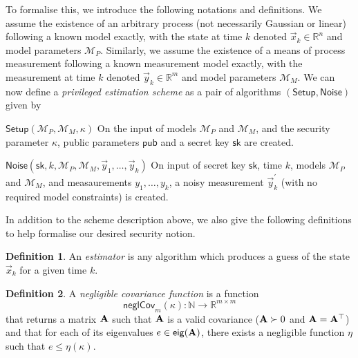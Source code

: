 \documentclass[letterpaper, 10 pt, conference]{IEEEtran}
\theoremstyle{definition}
\newtheorem{definition}{Definition}[section]
\theoremstyle{definition}
\theoremstyle{remark}
\begin{document}
To formalise this, we introduce the following notations and definitions. We assume the existence of an arbitrary process (not necessarily Gaussian or linear) following a known model exactly, with the state at time $k$ denoted $\vec{x}_k\in\mathbb{R}^n$ and model parameters $\mathcal{M}_P$. Similarly, we assume the existence of a means of process measurement following a known measurement model exactly, with the measurement at time $k$ denoted $\vec{y}_k\in\mathbb{R}^m$ and model parameters $\mathcal{M}_M$. We can now define a \textit{privileged estimation scheme} as a pair of algorithms $(\mathsf{Setup},\mathsf{Noise})$ given by
\begin{LaTeXdescription}
   \item[$\mathsf{Setup}(\mathcal{M}_P, \mathcal{M}_M, \kappa)$] On the input of models $\mathcal{M}_P$ and $\mathcal{M}_M$, and the security parameter $\kappa$, public parameters $\mathsf{pub}$ and a secret key $\mathsf{sk}$ are created.
   \item[$\mathsf{Noise}(\mathsf{sk}, k, \mathcal{M}_P, \mathcal{M}_M, \vec{y}_1, \dots, \vec{y}_k)$] On input of secret key $\mathsf{sk}$, time $k$, models $\mathcal{M}_P$ and $\mathcal{M}_M$, and measaurements $y_1,\dots,y_k$, a noisy measurement $\vec{y}^\prime_k$ (with no required model constraints) is created.
\end{LaTeXdescription}
In addition to the scheme description above, we also give the following definitions to help formalise our desired security notion.
\begin{definition}\label{def:estimator}
   An \textit{estimator} is any algorithm which produces a guess of the state $\vec{x}_k$ for a given time $k$.
\end{definition}
\begin{definition}
   A \textit{negligible covariance function} is a function 
   \begin{equation}
      \mathsf{neglCov}_m(\kappa):\mathbb{N}\rightarrow \mathbb{R}^{m\times m}
   \end{equation}
   that returns a matrix ${{\mathbf{A}}}$ such that ${{\mathbf{A}}}$ is a valid covariance (${{\mathbf{A}}}\succ 0$ and ${{\mathbf{A}}}={{\mathbf{A}}}^\top$) and that for each of its eigenvalues $e\in\mathsf{eig}({{\mathbf{A}}})$, there exists a negligible function $\eta$ such that $e\leq\eta(\kappa)$.
\end{definition}
\end{document}
